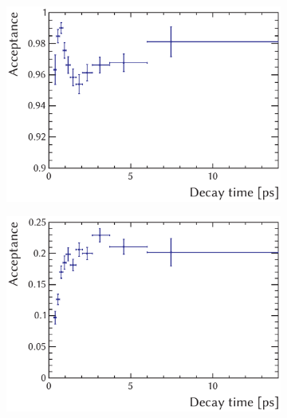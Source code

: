\begin{figure}[htbp]
  \centering
  \begin{subfigure}{0.49\textwidth}
    \includegraphics[width=\textwidth]{graphics/analysis/trigTimeAcc_2011_UB}
    \caption{}
    \label{fig:trigAcc_2011_UB}
  \end{subfigure}%
  \hfill%
  \begin{subfigure}{0.49\textwidth}
    \includegraphics[width=\textwidth]{graphics/analysis/trigTimeAcc_2011_exclB}
    \caption{}
    \label{fig:trigAcc_2011_exclB}
  \end{subfigure}


\end{figure}
